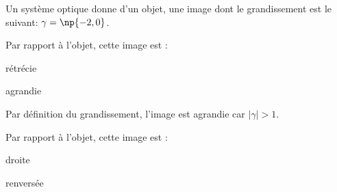 
\finEntrainement






\hauteurLargeurCadreReponse		{6mm}{1.5cm}
\initialisationEntrainement


Un système optique donne d'un objet, une image dont le grandissement est le suivant: $\gamma=\np{-2,0}$. 
\medskip

\debutEntrainement


\begin{enonce}
Par rapport à l'objet, cette image est :
	
	\begin{listeQCM2Colonnes}
	\item rétrécie
	\item agrandie
	\end{listeQCM2Colonnes}
\bigskip\smallskip
\end{enonce}

\reponse{\reponseB{}}

\begin{corrige}
Par définition du grandissement, l'image est agrandie car $|\gamma|>1$.
\end{corrige}



\begin{enonce}
Par rapport à l'objet, cette image est :
	
	\begin{listeQCM2Colonnes}
	\item droite
	\item renversée
	\end{listeQCM2Colonnes}
\bigskip\smallskip
\end{enonce}

